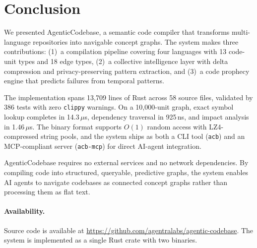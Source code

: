 \documentclass[10pt, twocolumn]{article}
\begin{document}
\section{Conclusion}
\label{sec:conclusion}

We presented AgenticCodebase, a semantic code compiler that transforms multi-language repositories into navigable concept graphs. The system makes three contributions: (1)~a compilation pipeline covering four languages with 13 code-unit types and 18 edge types, (2)~a collective intelligence layer with delta compression and privacy-preserving pattern extraction, and (3)~a code prophecy engine that predicts failures from temporal patterns.

The implementation spans 13{,}709 lines of Rust across 58 source files, validated by 386 tests with zero \texttt{clippy} warnings. On a 10{,}000-unit graph, exact symbol lookup completes in 14.3\,$\mu$s, dependency traversal in 925\,ns, and impact analysis in 1.46\,$\mu$s. The binary format supports $O(1)$ random access with LZ4-compressed string pools, and the system ships as both a CLI tool (\texttt{acb}) and an MCP-compliant server (\texttt{acb-mcp}) for direct AI-agent integration.

AgenticCodebase requires no external services and no network dependencies. By compiling code into structured, queryable, predictive graphs, the system enables AI agents to navigate codebases as connected concept graphs rather than processing them as flat text.

\paragraph{Availability.} Source code is available at \url{https://github.com/agentralabs/agentic-codebase}. The system is implemented as a single Rust crate with two binaries.




\end{document}
